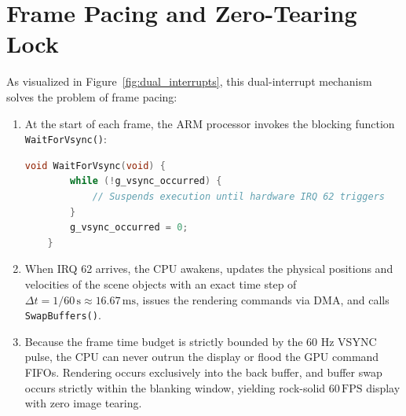 \section{Frame Pacing and Zero-Tearing Lock}
As visualized in Figure~\ref{fig:dual_interrupts}, this dual-interrupt mechanism solves the problem of frame pacing:
\begin{enumerate}
    \item At the start of each frame, the ARM processor invokes the blocking function \texttt{WaitForVsync()}:
    \begin{lstlisting}[language=C, caption={Hardware VSYNC Synchronization Function in \texttt{main.c}.}, label={lst:wait_vsync}]
    void WaitForVsync(void) {
        while (!g_vsync_occurred) {
            // Suspends execution until hardware IRQ 62 triggers
        }
        g_vsync_occurred = 0;
    }
    \end{lstlisting}
    \item When IRQ 62 arrives, the CPU awakens, updates the physical positions and velocities of the scene objects with an exact time step of $\Delta t = 1/60\,\text{s} \approx 16.67\,\text{ms}$, issues the rendering commands via DMA, and calls \texttt{SwapBuffers()}.
    \item Because the frame time budget is strictly bounded by the 60 Hz VSYNC pulse, the CPU can never outrun the display or flood the GPU command FIFOs. Rendering occurs exclusively into the back buffer, and buffer swap occurs strictly within the blanking window, yielding rock-solid $60\,\text{FPS}$ display with zero image tearing.
\end{enumerate}
